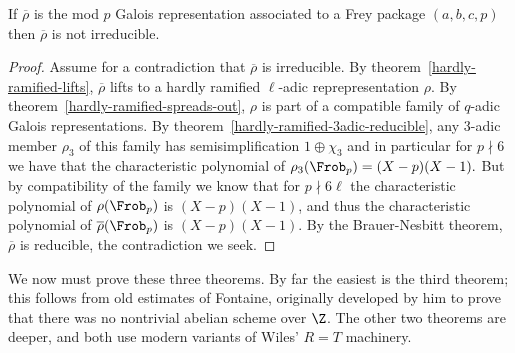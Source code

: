 \begin{theorem}
  \label{FLT.Wiles_Frey'}
  \leanok
  If $\overline{\rho}$ is the mod $p$ Galois representation associated to a Frey package $(a,b,c,p)$ then
  $\overline{\rho}$ is not irreducible.
\end{theorem}
\begin{proof}
  Assume for a contradiction that $\overline{\rho}$ is irreducible. By theorem~\ref{hardly-ramified-lifts},
  $\overline{\rho}$ lifts to a hardly ramified $\ell$-adic reprepresentation $\rho$. By
  theorem~\ref{hardly-ramified-spreads-out}, $\rho$ is part of a compatible family of
  $q$-adic Galois representations. By theorem~\ref{hardly-ramified-3adic-reducible},
  any 3-adic member $\rho_3$ of this family has semisimplification $1\oplus\chi_3$ and in particular
  for $p\nmid 6$ we have that the characteristic polynomial of $\rho_3(\Frob_p)=(X-p)(X-1).$
  But by compatibility of the family we know that for $p\nmid 6\ell$ the characteristic
  polynomial of $\rho(\Frob_p)$ is $(X-p)(X-1)$, and thus the characteristic polynomial
  of $\overline{\rho}(\Frob_p)$ is $(X-p)(X-1)$. By the Brauer-Nesbitt theorem, $\overline{\rho}$
  is reducible, the contradiction we seek.
\end{proof}

We now must prove these three theorems. By far the easiest is the third theorem; this follows
from old estimates of Fontaine, originally developed by him to prove that there was no
nontrivial abelian scheme over $\Z$. The other two theorems are deeper, and both use
modern variants of Wiles' $R=T$ machinery.
